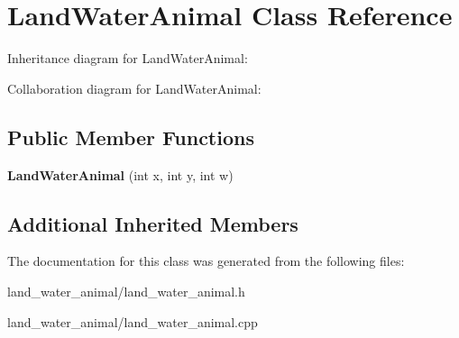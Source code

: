 \hypertarget{classLandWaterAnimal}{}\section{Land\+Water\+Animal Class Reference}
\label{classLandWaterAnimal}


Inheritance diagram for Land\+Water\+Animal\+:


Collaboration diagram for Land\+Water\+Animal\+:
\subsection*{Public Member Functions}
\begin{DoxyCompactItemize}
\item 
{\bfseries Land\+Water\+Animal} (int x, int y, int w)\hypertarget{classLandWaterAnimal_adef93b8ab6ece0bf9c12a53569c4c794}{}\label{classLandWaterAnimal_adef93b8ab6ece0bf9c12a53569c4c794}

\end{DoxyCompactItemize}
\subsection*{Additional Inherited Members}


The documentation for this class was generated from the following files\+:\begin{DoxyCompactItemize}
\item 
land\+\_\+water\+\_\+animal/land\+\_\+water\+\_\+animal.\+h\item 
land\+\_\+water\+\_\+animal/land\+\_\+water\+\_\+animal.\+cpp\end{DoxyCompactItemize}
